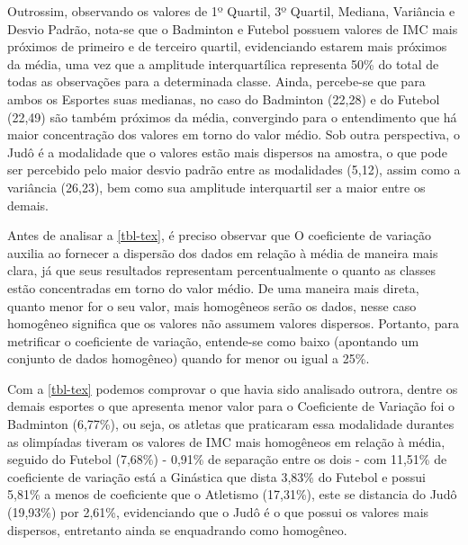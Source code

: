\documentclass[
]{estat/estat}
\begin{document}
Outrossim, observando os valores de 1º Quartil, 3º Quartil, Mediana,
Variância e Desvio Padrão, nota-se que o Badminton e Futebol possuem
valores de IMC mais próximos de primeiro e de terceiro quartil,
evidenciando estarem mais próximos da média, uma vez que a amplitude
interquartílica representa 50\% do total de todas as observações para a
determinada classe. Ainda, percebe-se que para ambos os Esportes suas
medianas, no caso do Badminton (22,28) e do Futebol (22,49) são também
próximos da média, convergindo para o entendimento que há maior
concentração dos valores em torno do valor médio. Sob outra perspectiva,
o Judô é a modalidade que o valores estão mais dispersos na amostra, o
que pode ser percebido pelo maior desvio padrão entre as modalidades
(5,12), assim como a variância (26,23), bem como sua amplitude
interquartil ser a maior entre os demais.

\begin{table}[H]

\caption{\label{tbl-tex}Coeficiente de variação dos esportes de
interesse}


\end{table}%

Antes de analisar a \ref{tbl-tex}, é preciso observar que O coeficiente
de variação auxilia ao fornecer a dispersão dos dados em relação à média
de maneira mais clara, já que seus resultados representam
percentualmente o quanto as classes estão concentradas em torno do valor
médio. De uma maneira mais direta, quanto menor for o seu valor, mais
homogêneos serão os dados, nesse caso homogêneo significa que os valores
não assumem valores dispersos. Portanto, para metrificar o coeficiente
de variação, entende-se como baixo (apontando um conjunto de dados
homogêneo) quando for menor ou igual a 25\%.

Com a \ref{tbl-tex} podemos comprovar o que havia sido analisado
outrora, dentre os demais esportes o que apresenta menor valor para o
Coeficiente de Variação foi o Badminton (6,77\%), ou seja, os atletas
que praticaram essa modalidade durantes as olimpíadas tiveram os valores
de IMC mais homogêneos em relação à média, seguido do Futebol (7,68\%) -
0,91\% de separação entre os dois - com 11,51\% de coeficiente de
variação está a Ginástica que dista 3,83\% do Futebol e possui 5,81\% a
menos de coeficiente que o Atletismo (17,31\%), este se distancia do
Judô (19,93\%) por 2,61\%, evidenciando que o Judô é o que possui os
valores mais dispersos, entretanto ainda se enquadrando como homogêneo.
\end{document}

